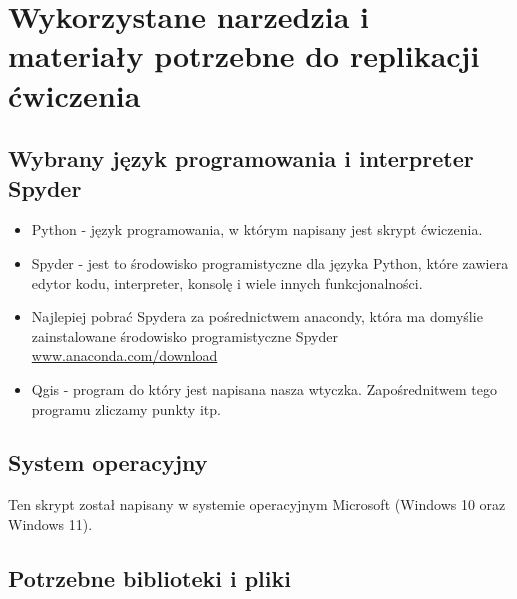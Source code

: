 \section{Wykorzystane narzedzia i materiały potrzebne do replikacji ćwiczenia}

\subsection{Wybrany język programowania i interpreter Spyder}

\begin{itemize}
	\item Python - język programowania, w którym napisany jest skrypt ćwiczenia.
	\item Spyder - jest to środowisko programistyczne dla języka Python, które zawiera edytor kodu, interpreter, konsolę i wiele innych funkcjonalności.
	\item Najlepiej pobrać Spydera za pośrednictwem anacondy, która ma domyślie zainstalowane środowisko programistyczne Spyder \href{https://www.anaconda.com/download}{www.anaconda.com/download}	\citep{Anaconda}
	\item Qgis - program do który jest napisana nasza wtyczka. Zapośrednitwem tego programu zliczamy punkty itp.
\end{itemize}

\subsection{System operacyjny}

Ten skrypt został napisany w systemie operacyjnym Microsoft (Windows 10 oraz Windows 11).

\subsection{Potrzebne biblioteki i pliki}

